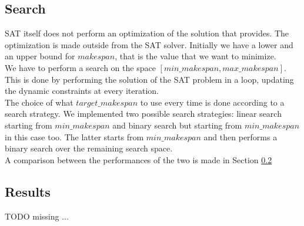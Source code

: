 
\subsection{Search}\label{subsec:SAT_search}
  SAT itself does not perform an optimization of the solution that provides.
  The optimization is made outside from the SAT solver. Initially we have a lower and an upper bound
  for \(makespan\), that is the value that we want to minimize.\\

  We have to perform a search on the space \([min\_makespan, max\_makespan]\). This is done by performing
  the solution of the SAT problem in a loop, updating the dynamic constraints at every iteration.\\

  The choice of what \(target\_makespan\) to use every time is done according to a search strategy.
  We implemented two possible search strategies: linear search starting from \(min\_makespan\) and
  binary search but starting from \(min\_makespan\) in this case too.
  The latter starts from \(min\_makespan\) and then performs a binary search over the remaining
  search space.\\

  A comparison between the performances of the two is made in Section \ref{subsec:SAT_results}


\subsection{Results}\label{subsec:SAT_results}
    \colorbox{BurntOrange}{TODO missing ...}
